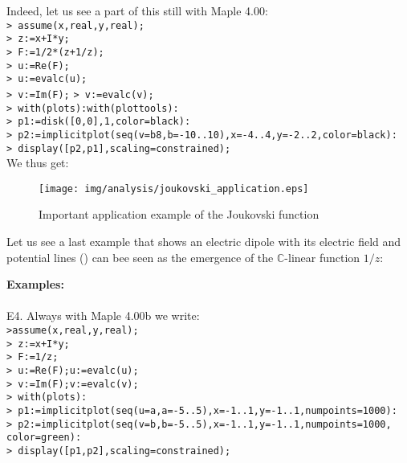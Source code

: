 	\pagebreak
	\begin{tcolorbox}[colframe=black,colback=white,sharp corners]
Indeed, let us see a part of this still with Maple 4.00:\\

\texttt{> assume(x,real,y,real);}\\
\texttt{> z:=x+I*y;}\\
\texttt{> F:=1/2*(z+1/z);}\\
\texttt{> u:=Re(F);}\\
\texttt{> u:=evalc(u);}\\
\texttt{> v:=Im(F);}
\texttt{> v:=evalc(v);}\\
\texttt{> with(plots):with(plottools):}\\
\texttt{> p1:=disk([0,0],1,color=black):}\\
\texttt{> p2:=implicitplot({seq(v=b8,b=-10..10)},x=-4..4,y=-2..2,color=black):}\\
\texttt{> display([p2,p1],scaling=constrained);}\\

We thus get:

	\begin{figure}[H]
		\begin{center}
			\texttt{[image: img/analysis/joukovski\_application.eps]}
		\end{center}	
		\caption{Important application example of the Joukovski function}
	\end{figure}

	\end{tcolorbox}
	Let us see a last example that shows an electric dipole with its electric field and potential lines () can bee seen as the emergence of the $\mathbb{C}$-linear function $1/z$:

	\begin{tcolorbox}[colframe=black,colback=white,sharp corners]
\textbf{{\Large {}}Examples:}\\\\
E4. Always with Maple 4.00b we write:\\

\texttt{>assume(x,real,y,real);}\\
\texttt{> z:=x+I*y;}\\
\texttt{> F:=1/z;}\\
\texttt{> u:=Re(F);u:=evalc(u);}\\
\texttt{> v:=Im(F);v:=evalc(v);}\\
\texttt{> with(plots):}\\
\texttt{> p1:=implicitplot({seq(u=a,a=-5..5)},x=-1..1,y=-1..1,numpoints=1000):}\\
\texttt{> p2:=implicitplot({seq(v=b,b=-5..5)},x=-1..1,y=-1..1,numpoints=1000,}\\
\texttt{color=green):}\\
\texttt{> display([p1,p2],scaling=constrained);}\\
	\end{tcolorbox}
	
